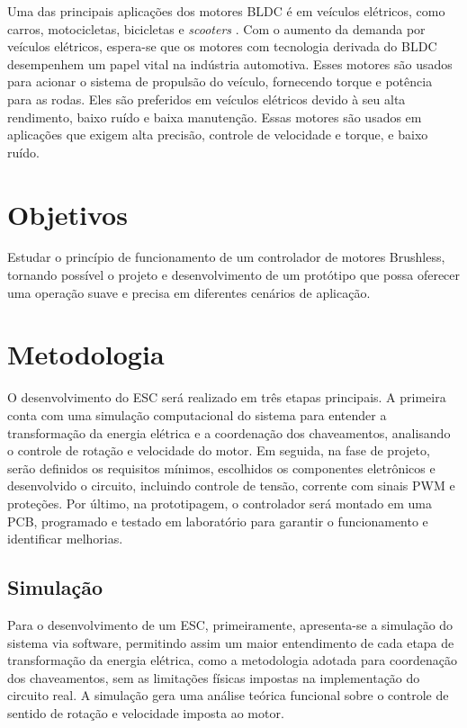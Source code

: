 \documentclass[12pt, a4paper]{article}
\begin{document}
Uma das principais aplicações dos motores BLDC é em veículos elétricos, como carros, motocicletas, bicicletas e \textit{scooters} \cite{chau2007emerging}. Com o aumento da demanda por veículos elétricos, espera-se que os motores com tecnologia derivada do BLDC desempenhem um papel vital na indústria automotiva. Esses motores são usados para acionar o sistema de propulsão do veículo, fornecendo torque e potência para as rodas. Eles são preferidos em veículos elétricos devido à seu alta rendimento, baixo ruído e baixa manutenção. Essas motores são usados em aplicações que exigem alta precisão, controle de velocidade e torque, e baixo ruído.

\section{Objetivos}
Estudar o princípio de funcionamento de um controlador de motores Brushless, tornando possível o projeto e desenvolvimento de um protótipo que possa oferecer uma operação suave e precisa em diferentes cenários de aplicação.

\section{Metodologia}
O desenvolvimento do ESC será realizado em três etapas principais. A primeira conta com uma simulação computacional do sistema para entender a transformação da energia elétrica e a coordenação dos chaveamentos, analisando o controle de rotação e velocidade do motor. Em seguida, na fase de projeto, serão definidos os requisitos mínimos, escolhidos os componentes eletrônicos e desenvolvido o circuito, incluindo controle de tensão, corrente com sinais PWM e proteções. Por último, na prototipagem, o controlador será montado em uma PCB, programado e testado em laboratório para garantir o funcionamento e identificar melhorias.

\subsection{Simulação}
Para o desenvolvimento de um ESC, primeiramente, apresenta-se a simulação do sistema via software, permitindo assim um maior entendimento de cada etapa de transformação da energia elétrica, como a metodologia adotada para coordenação dos chaveamentos, sem as limitações físicas impostas na implementação do circuito real. A simulação gera uma análise teórica funcional sobre o controle de sentido de rotação e velocidade imposta ao motor.
\end{document}
